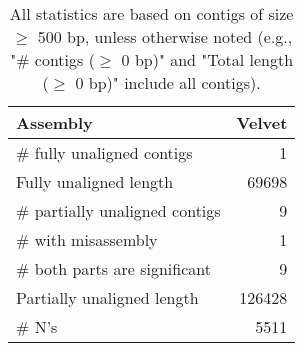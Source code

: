 \documentclass[12pt,a4paper]{article}
\begin{document}
\begin{table}[ht]
\begin{center}
\caption{All statistics are based on contigs of size $\geq$ 500 bp, unless otherwise noted (e.g., "\# contigs ($\geq$ 0 bp)" and "Total length ($\geq$ 0 bp)" include all contigs).}
\begin{tabular}{|l*{1}{|r}|}
\hline
Assembly & Velvet \\ \hline
\# fully unaligned contigs & 1 \\ \hline
Fully unaligned length & 69698 \\ \hline
\# partially unaligned contigs & 9 \\ \hline
\hspace{5mm}\# with misassembly & 1 \\ \hline
\hspace{5mm}\# both parts are significant & 9 \\ \hline
Partially unaligned length & 126428 \\ \hline
\# N's & 5511 \\ \hline
\end{tabular}
\end{center}
\end{table}
\end{document}
